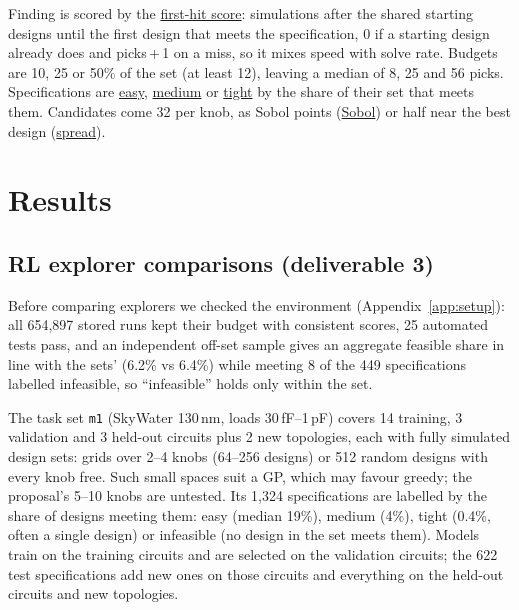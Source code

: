 \documentclass[10pt]{article}
\begin{document}
Finding is scored by the \uline{first-hit score}: simulations after the shared starting designs until the first design
that meets the specification, 0 if a starting design already does and picks\,+\,1 on a miss, so it mixes speed with
solve rate. Budgets are 10, 25 or 50\% of the set (at least 12), leaving a median of 8, 25 and 56 picks.
Specifications are \uline{easy}, \uline{medium} or \uline{tight} by the share of their set that meets them. Candidates
come 32 per knob, as Sobol points (\uline{Sobol}) or half near the best design (\uline{spread}).

\section{Results}
\subsection{RL explorer comparisons (deliverable 3)}\label{sec:rl}
Before comparing explorers we checked the environment (Appendix~\ref{app:setup}): all 654,897 stored runs kept their budget with consistent scores, 25 automated tests pass, and an independent off-set sample gives an aggregate
feasible share in line with the sets' (6.2\% vs 6.4\%) while meeting 8 of the 449 specifications labelled
infeasible, so ``infeasible'' holds only within the set.

The task set \texttt{m1} (SkyWater 130\,nm, loads 30\,fF--1\,pF) covers 14 training, 3 validation and 3 held-out
circuits plus 2 new topologies, each with fully simulated design sets: grids over 2--4 knobs (64--256 designs) or 512
random designs with every knob free. Such small spaces suit a GP, which may favour greedy; the
proposal's 5--10 knobs are untested. Its 1,324 specifications are labelled by the share of designs meeting them: easy (median 19\%), medium
(4\%), tight (0.4\%, often a single design) or infeasible (no design in the set meets them). Models train on the training circuits and are selected on
the validation circuits; the 622 test specifications add new ones on those circuits and everything on the held-out
circuits and new topologies.
\end{document}
